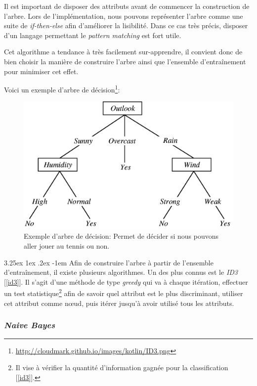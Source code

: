 \documentclass[a4paper, 11pt]{article}
\makeatletter
\renewcommand\paragraph{\@startsection{paragraph}{5}{\z@}%
  {3.25ex \@plus1ex \@minus.2ex}%
  {-1em}%
  {\normalfont\normalsize\bfseries}}
\makeatother
\begin{document}
Il est important de disposer des attributs avant de commencer la construction de l'arbre. Lors de l'implémentation, nous pouvons représenter l'arbre comme une suite de \textit{if-then-else} afin d'améliorer la lisibilité. Dans ce cas très précis, disposer d'un langage permettant le \textit{pattern matching} est fort utile.

Cet algorithme a tendance à très facilement sur-apprendre, il convient donc de bien choisir la manière de construire l'arbre ainsi que l'ensemble d'entraînement pour minimiser cet effet. 

Voici un exemple d'arbre de décision\footnote{\url{http://cloudmark.github.io/images/kotlin/ID3.png}}:
\begin{figure}[h!]
\centering
\includegraphics{images/exemple_tree}
\caption{Exemple d'arbre de décision: Permet de décider si nous pouvons aller jouer au tennis ou non.}
\end{figure}

\paragraph{}
Afin de construire l'arbre à partir de l'ensemble d'entraînement, il existe plusieurs algorithmes. Un des plus connus est le \textit{ID3} [\ref{id3}]. Il s'agit d'une méthode de type \textit{greedy} qui va à chaque itération, effectuer un test statistique\footnote{Il vise à vérifier la quantité d'information gagnée pour la classification [\ref{id3}].} afin de savoir quel attribut est le plus discriminant, utiliser cet attribut comme nœud, puis itérer jusqu'à avoir utilisé tous les attributs.


\subsubsection{\textit{Naive Bayes}}\label{section naive bayes}
\end{document}
